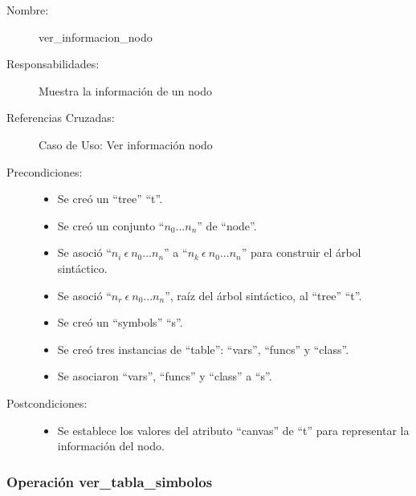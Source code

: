 	\begin{description}
		\item [Nombre:] ver\_informacion\_nodo
		\item [Responsabilidades:] Muestra la información de un nodo
		\item [Referencias Cruzadas: ] Caso de Uso: Ver información nodo
      \item [Precondiciones:] \hfill
         \begin {itemize}
         \item Se creó un ``tree'' ``t''.
         \item Se creó un conjunto ``$n_0...n_n$'' de ``node''.
         \item Se asoció ``$n_i\ \epsilon\ n_0...n_n$'' a ``$n_k\ \epsilon\ n_0...n_n$'' para construir el árbol sintáctico.
         \item Se asoció  ``$n_r\ \epsilon\ n_0...n_n$'', raíz del árbol sintáctico, al ``tree'' ``t''.
         \item Se creó un ``symbols'' ``s''.
         \item Se creó tres instancias de ``table'': ``vars'', ``funcs'' y ``class''.
         \item Se asociaron ``vars'', ``funcs'' y ``class'' a ``s''.
      \end{itemize}
      \item [Postcondiciones:] \hfill
      \begin {itemize}
         \item Se establece los valores del atributo ``canvas'' de ``t'' para representar la información del nodo.
      \end{itemize}
	\end{description} 


\subsubsection{Operación ver\_tabla\_simbolos}

